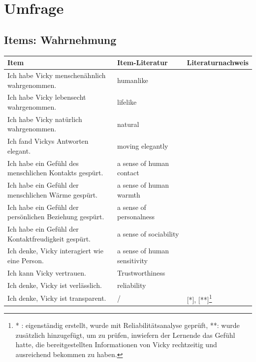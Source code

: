\chapter{Umfrage} 
\section{Items: Wahrnehmung} \label{Umfrage}
\begingroup
\footnotesize 
\begin{longtable}{|m{6cm}|m{4cm}|m{5cm}|}
  \hline
    \rowcolor[HTML]{EFEFEF} 
    \centering \textbf{Item} &\centering \textbf{Item-Literatur} & \centering \arraybackslash  \textbf{Literaturnachweis} \\    \hline \hline
   Ich habe Vicky menschenähnlich wahrgenommen. & humanlike & \parencite[6 f.]{Holtgraves.2007}  \\ \hline
   Ich habe Vicky lebensecht wahrgenommen. & lifelike & \parencite[74]{Bartneck.2008} \parencite[5]{Powers.2006}  \\ \hline
   Ich habe Vicky natürlich wahrgenommen. & natural & \parencite[74]{Bartneck.2008} \parencite[5]{Powers.2006}  \\ \hline
   Ich fand Vickys Antworten elegant. & moving elegantly & \parencite[74]{Bartneck.2008}  \parencite[5]{Powers.2006}  \\ \hline
   Ich habe ein Gefühl des menschlichen Kontakts gespürt. & a sense of human contact  & \parencite[12]{Brendel.2021} \parencite[11]{Gefen.1997}  \\ \hline
   Ich habe ein Gefühl der menschlichen Wärme gespürt. & a sense of human warmth   & \parencite[12]{Brendel.2021} \parencite[11]{Gefen.1997}  \\ \hline
   Ich habe ein Gefühl der persönlichen Beziehung gespürt. & a sense of personalness   & \parencite[12]{Brendel.2021} \parencite[11]{Gefen.1997}  \\ \hline
   Ich habe ein Gefühl der Kontaktfreudigkeit gespürt. & a sense of sociability   & \parencite[12]{Brendel.2021} \parencite[11]{Gefen.1997}  \\ \hline
   Ich denke, Vicky interagiert wie eine Person. & a sense of human sensitivity   & \parencite[12]{Brendel.2021} \parencite[11]{Gefen.1997}  \\ \hline
    
   Ich kann Vicky vertrauen.& Trustworthiness  & \parencite[363]{Lee.2002} \\ \hline
  Ich denke, Vicky ist verlässlich. & reliability  & \parencite[153]{Jiang.2002} \\ \hline
  Ich denke, Vicky ist transparent. & /  & [*], [**]\footnote{* : eigenständig erstellt, wurde mit Reliabilitätsanalyse geprüft, **: wurde zusätzlich hinzugefügt, um zu prüfen, inwiefern der Lernende das Gefühl hatte, die bereitgestellten Informationen von Vicky rechtzeitig und ausreichend bekommen zu haben.  } \\ \hline


\end{longtable}
